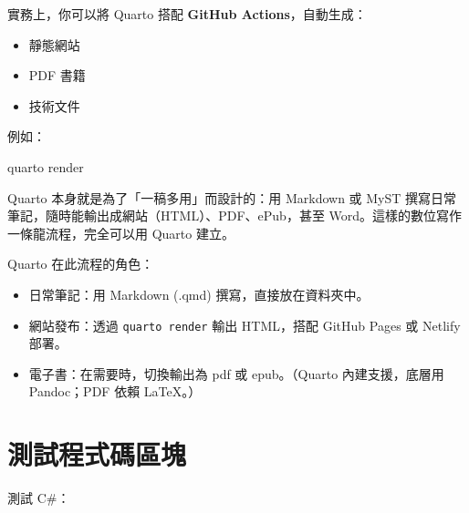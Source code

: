 \documentclass[
  chinese,
  11pt,
  a4paper,
]{book}
\newenvironment{Shaded}{\begin{snugshade}}{\end{snugshade}}
\newcommand{\CommentTok}[1]{\textcolor[rgb]{0.37,0.37,0.37}{#1}}
\newcommand{\DataTypeTok}[1]{\textcolor[rgb]{0.68,0.00,0.00}{#1}}
\newcommand{\DecValTok}[1]{\textcolor[rgb]{0.68,0.00,0.00}{#1}}
\newcommand{\ExtensionTok}[1]{\textcolor[rgb]{0.00,0.23,0.31}{#1}}
\newcommand{\FunctionTok}[1]{\textcolor[rgb]{0.28,0.35,0.67}{#1}}
\newcommand{\NormalTok}[1]{\textcolor[rgb]{0.00,0.23,0.31}{#1}}
\newcommand{\OperatorTok}[1]{\textcolor[rgb]{0.37,0.37,0.37}{#1}}
\newcommand{\StringTok}[1]{\textcolor[rgb]{0.13,0.47,0.30}{#1}}
\providecommand{\tightlist}{%
  \setlength{\itemsep}{0pt}\setlength{\parskip}{0pt}}
\begin{document}
實務上，你可以將 Quarto 搭配 \textbf{GitHub Actions}，自動生成：

\begin{itemize}
\tightlist
\item
  靜態網站
\item
  PDF 書籍
\item
  技術文件
\end{itemize}

例如：

\begin{Shaded}
\begin{Highlighting}[numbers=left,,]
\ExtensionTok{quarto}\NormalTok{ render}
\end{Highlighting}
\end{Shaded}

Quarto 本身就是為了「一稿多用」而設計的：用 Markdown 或 MyST
撰寫日常筆記，隨時能輸出成網站（HTML）、PDF、ePub，甚至
Word。這樣的數位寫作一條龍流程，完全可以用 Quarto 建立。

Quarto 在此流程的角色：

\begin{itemize}
\tightlist
\item
  日常筆記：用 Markdown (.qmd) 撰寫，直接放在資料夾中。
\item
  網站發布：透過 \texttt{quarto\ render} 輸出 HTML，搭配 GitHub Pages 或
  Netlify 部署。
\item
  電子書：在需要時，切換輸出為 pdf 或 epub。（Quarto 內建支援，底層用
  Pandoc；PDF 依賴 LaTeX。）
\end{itemize}

\section{測試程式碼區塊}\label{ux6e2cux8a66ux7a0bux5f0fux78bcux5340ux584a}

測試 C\#：

\begin{Shaded}
\end{Shaded}
\end{document}
